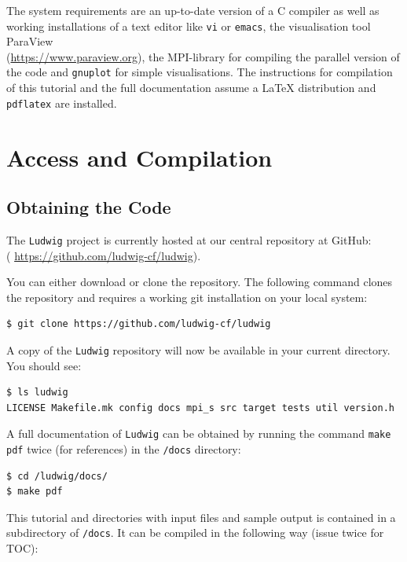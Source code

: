 \documentclass[11pt,twoside,a4paper]{article}
\begin{document}
The system requirements are an up-to-date version of a C compiler as well as working installations 
of a text editor like \texttt{vi} or \texttt{emacs}, the visualisation tool
ParaView \\
({\color{blue}\hyperref[ParaView]{https://www.paraview.org}}), the MPI-library 
for compiling the parallel version of the code and \texttt{gnuplot} for simple visualisations.
The instructions for compilation of this tutorial and the full documentation assume a LaTeX distribution
and \texttt{pdflatex} are installed.

\section{Access and Compilation}

\subsection{Obtaining the Code}
\label{sec:getCode}

The \texttt{Ludwig} project is currently hosted at our central repository at GitHub:\\
({\color{blue} \hyperref[GitHubLudwig]{https://github.com/ludwig-cf/ludwig}}).
\smallskip

You can either download or clone the repository. 
The following command clones the repository and requires a working 
git installation on your local system:

\begin{lstlisting}[style=terminalverbatim]
$ git clone https://github.com/ludwig-cf/ludwig
\end{lstlisting}

A copy of the \texttt{Ludwig} repository will now be available in your current directory. 
You should see:

\begin{lstlisting}
$ ls ludwig
LICENSE Makefile.mk config docs mpi_s src target tests util version.h
\end{lstlisting}

A full documentation of \texttt{Ludwig} can be obtained by running 
the command \texttt{make pdf} twice (for references) in the \texttt{/docs} directory:

\begin{lstlisting}[style=terminalverbatim]
$ cd /ludwig/docs/
$ make pdf
\end{lstlisting}

This tutorial and directories with input files and sample output is contained in 
a subdirectory of \texttt{/docs}. It can be compiled in the following way (issue twice for TOC):
\end{document}
